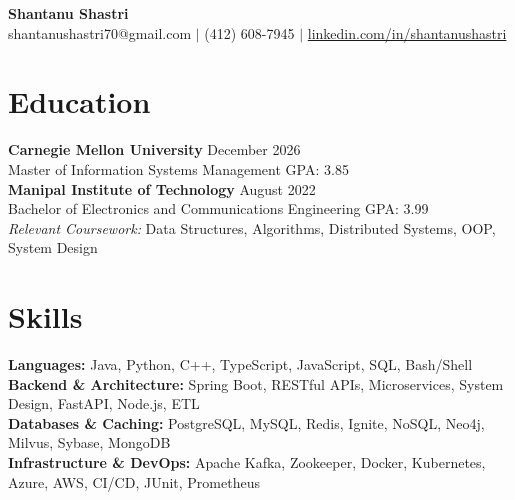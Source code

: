 \documentclass[11pt,a4paper]{article}
\begin{document}
\begin{center}
    \Huge \textbf{Shantanu Shastri} \\
    \vspace{2pt}
    \small shantanushastri70@gmail.com $|$ (412) 608-7945 $|$ \href{https://linkedin.com/in/shantanushastri}{linkedin.com/in/shantanushastri}
\end{center}

\vspace{-5pt}
\section{Education}
\noindent
\textbf{Carnegie Mellon University} \hfill December 2026 \\
Master of Information Systems Management \hfill GPA: 3.85 \\
\textbf{Manipal Institute of Technology} \hfill August 2022 \\
Bachelor of Electronics and Communications Engineering \hfill GPA: 3.99 \\
\textit{Relevant Coursework:} Data Structures, Algorithms, Distributed Systems, OOP, System Design

\vspace{-5pt}
\section{Skills}
\noindent
\textbf{Languages:} Java, Python, C++, TypeScript, JavaScript, SQL, Bash/Shell \\
\textbf{Backend \& Architecture:} Spring Boot, RESTful APIs, Microservices, System Design, FastAPI, Node.js, ETL \\
\textbf{Databases \& Caching:} PostgreSQL, MySQL, Redis, Ignite, NoSQL, Neo4j, Milvus, Sybase, MongoDB \\
\textbf{Infrastructure \& DevOps:} Apache Kafka, Zookeeper, Docker, Kubernetes, Azure, AWS, CI/CD, JUnit, Prometheus

\vspace{-5pt}
\end{document}
